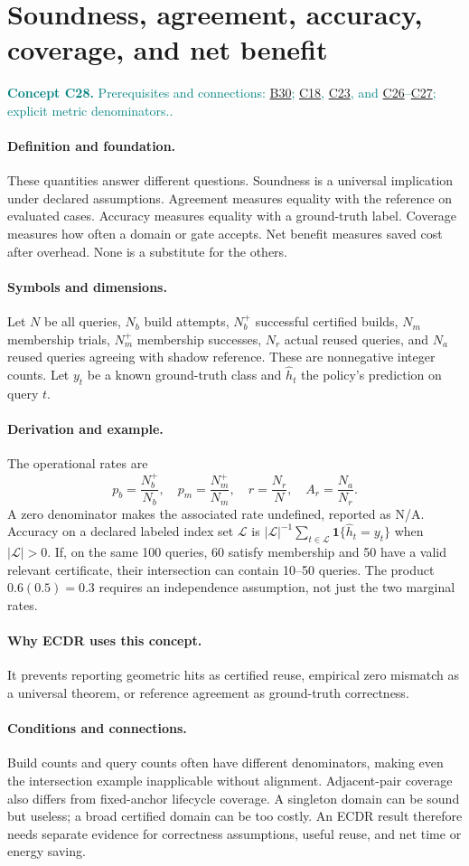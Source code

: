 \documentclass[11pt,a4paper]{article}
\newcommand{\abs}[1]{\left\lvert#1\right\rvert}
\newcommand{\conceptid}{Front matter}
\newcommand{\concept}[3]{\clearpage\renewcommand{\conceptid}{#1}%
\section{#2}\label{concept:#1}%
\textcolor{teal}{\textbf{Concept #1.} Prerequisites and connections: #3.}\par
\typeout{ECDR-CONCEPT-START #1 PAGE=\thepage}}
\begin{document}
\concept{C28}{Soundness, agreement, accuracy, coverage, and net benefit}{\hyperref[concept:B30]{B30}; \hyperref[concept:C18]{C18}, \hyperref[concept:C23]{C23}, and \hyperref[concept:C26]{C26}--\hyperref[concept:C27]{C27}; explicit metric denominators.}
\paragraph{Definition and foundation.}
These quantities answer different questions. Soundness is a universal implication under declared assumptions. Agreement measures equality with the reference on evaluated cases. Accuracy measures equality with a ground-truth label. Coverage measures how often a domain or gate accepts. Net benefit measures saved cost after overhead. None is a substitute for the others.
\paragraph{Symbols and dimensions.}
Let $N$ be all queries, $N_b$ build attempts, $N_b^+$ successful certified builds, $N_m$ membership trials, $N_m^+$ membership successes, $N_r$ actual reused queries, and $N_a$ reused queries agreeing with shadow reference. These are nonnegative integer counts. Let $y_t$ be a known ground-truth class and $\widehat h_t$ the policy's prediction on query $t$.
\paragraph{Derivation and example.}
The operational rates are
\[
 p_b=\frac{N_b^+}{N_b},\quad p_m=\frac{N_m^+}{N_m},\quad
 r=\frac{N_r}{N},\quad A_r=\frac{N_a}{N_r}.
\]
A zero denominator makes the associated rate undefined, reported as N/A. Accuracy on a declared labeled index set $\mathcal L$ is $\abs{\mathcal L}^{-1}\sum_{t\in\mathcal L}\mathbf1\{\widehat h_t=y_t\}$ when $\abs{\mathcal L}>0$.
If, on the same 100 queries, 60 satisfy membership and 50 have a valid relevant certificate, their intersection can contain 10--50 queries. The product $0.6(0.5)=0.3$ requires an independence assumption, not just the two marginal rates.
\paragraph{Why ECDR uses this concept.}
It prevents reporting geometric hits as certified reuse, empirical zero mismatch as a universal theorem, or reference agreement as ground-truth correctness.
\paragraph{Conditions and connections.}
Build counts and query counts often have different denominators, making even the intersection example inapplicable without alignment. Adjacent-pair coverage also differs from fixed-anchor lifecycle coverage. A singleton domain can be sound but useless; a broad certified domain can be too costly. An ECDR result therefore needs separate evidence for correctness assumptions, useful reuse, and net time or energy saving.
\par\label{endconcept:C28}
\end{document}
